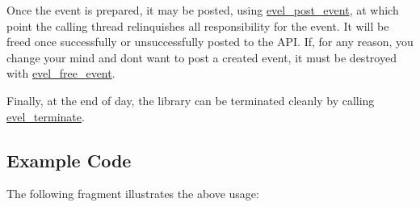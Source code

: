 Once the event is prepared, it may be posted, using \hyperlink{evel__event__mgr_8c_a209d2e5dbffe9e11ac79ae140f4a81bd}{evel\+\_\+post\+\_\+event}, at which point the calling thread relinquishes all responsibility for the event. It will be freed once successfully or unsuccessfully posted to the A\+PI. If, for any reason, you change your mind and don\textquotesingle{}t want to post a created event, it must be destroyed with \hyperlink{evel_8h_a91faa4e06c4b079c2a8a1db1ccb2e47b}{evel\+\_\+free\+\_\+event}.

Finally, at the end of day, the library can be terminated cleanly by calling \hyperlink{evel_8h_ab3f6225ddb9c5113d74503d4fcd17e5b}{evel\+\_\+terminate}.

\subsection*{Example Code}

The following fragment illustrates the above usage\+:


